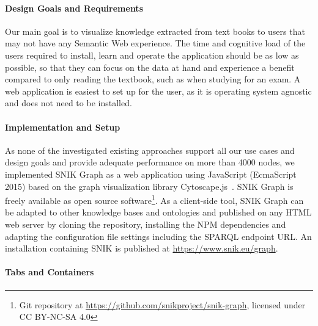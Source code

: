 \documentclass{IOS-Book-Article}     %
\begin{document}
\paragraph{Design Goals and Requirements}
Our main goal is to visualize knowledge extracted from text books to users that may not have any Semantic Web experience.
The time and cognitive load of the users required to install, learn and operate the application should be as low as possible, so that they can focus on the data at hand and experience a benefit compared to only reading the textbook, such as when studying for an exam.
A web application is easiest to set up for the user, as it is operating system agnostic and does not need to be installed.

\paragraph{Implementation and Setup}
As none of the investigated existing approaches support all our use cases and design goals and provide adequate performance on more than 4000 nodes, we implemented SNIK Graph as a web application using JavaScript (EcmaScript 2015) based on the graph visualization library Cytoscape.js~\cite{cytoscape}.
SNIK Graph is freely available as open source software\footnote{Git repository at \url{https://github.com/snikproject/snik-graph}, licensed under CC BY-NC-SA 4.0}.
As a client-side tool\footnotemark{}, SNIK Graph can be adapted to other knowledge bases and ontologies and published on any HTML web server by cloning the repository, installing the NPM dependencies and adapting the configuration file settings including the SPARQL endpoint URL.
%
An installation containing SNIK is published at \url{https://www.snik.eu/graph}.

\paragraph{Tabs and Containers}
\end{document}
